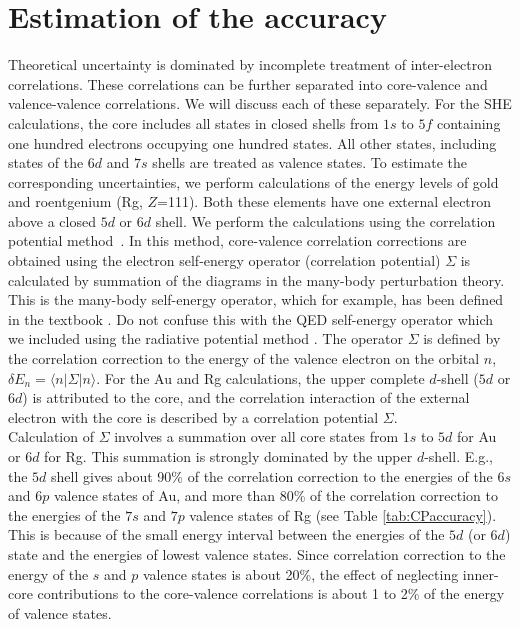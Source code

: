 \documentclass[10pt,a4paper, twoside, openright]{report}
\begin{document}
\section{Estimation of the accuracy} \label{sec:Accuracy}

Theoretical uncertainty is dominated by incomplete treatment of inter-electron correlations. These correlations can be further separated into core-valence and valence-valence correlations. We will discuss each of these separately. For the SHE calculations, the core includes all states in closed shells
from $1s$ to $5f$ containing one hundred electrons occupying one hundred states.
All other states, including states of the $6d$ and $7s$ shells are treated as
valence states. To estimate the corresponding uncertainties, we perform calculations of the energy levels of gold and roentgenium (Rg, $Z$=111). Both these elements have one external electron above a closed $5d$ or $6d$ shell. We perform the calculations using the correlation potential method~\cite{Dzuba1988, DFSS1987_2}. In this method, core-valence correlation corrections are obtained using the electron self-energy operator (correlation potential) $\Sigma$ is calculated by summation of the diagrams in the many-body perturbation theory. This is the many-body self-energy operator, which for example, has been defined in the textbook \cite{LandauStatPhysPart2}. Do not confuse this with  the QED self-energy operator which we included using the radiative potential method \cite{FG2005}. The operator $\Sigma $ is defined by the correlation correction to the energy of the valence electron on the orbital $n$, $\delta E_n = \langle n | \Sigma | n \rangle$.   For the Au and Rg calculations, the upper complete $d$-shell ($5d$ or $6d$) is attributed to the core, and the correlation interaction of the external electron with the core is described by a correlation potential $\Sigma$.   \\
\linebreak
Calculation of $\Sigma$ involves a summation over all core states from
$1s$ to $5d$ for Au or $6d$ for Rg. This summation is strongly dominated by the upper $d$-shell. E.g., the $5d$ shell gives about 90\% of the correlation correction to the energies of the $6s$ and $6p$ valence states of Au, and more than 80\% of the correlation correction to the energies of the $7s$ and $7p$ valence states of Rg (see Table \ref{tab:CPaccuracy}). This is because of the small energy interval between the energies of
the $5d$ (or $6d$) state and the energies of lowest valence states.  Since correlation correction to the energy of the $s$ and $p$ valence states is about 20\%, the effect of neglecting inner-core contributions to the core-valence correlations is about 1 to 2\% of the energy of valence states.\\
\end{document}
